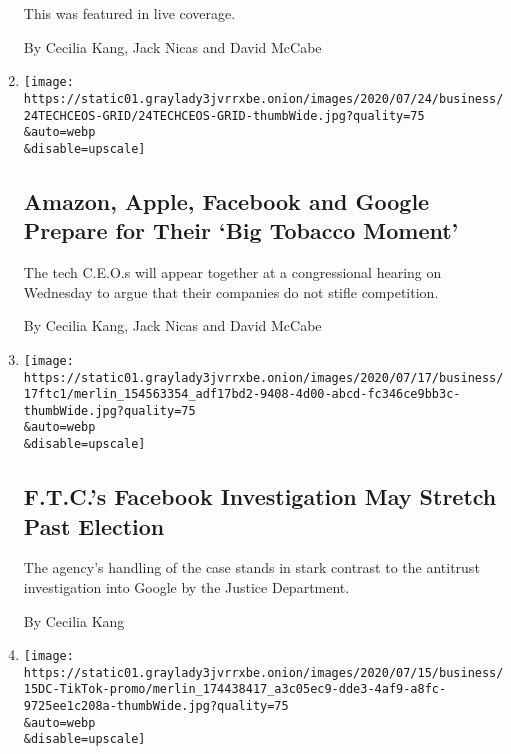 \begin{enumerate}
  This was featured in live coverage.

  By Cecilia Kang, Jack Nicas and David McCabe
\item
  \href{/2020/07/28/technology/amazon-apple-facebook-google-antitrust-hearing.html}{}

  \texttt{[image: https://static01.graylady3jvrrxbe.onion/images/2020/07/24/business/24TECHCEOS-GRID/24TECHCEOS-GRID-thumbWide.jpg?quality=75\\\&auto=webp\\\&disable=upscale]}

  \hypertarget{amazon-apple-facebook-and-google-prepare-for-their-big-tobacco-moment}{%
  \subsection{Amazon, Apple, Facebook and Google Prepare for Their `Big
  Tobacco
  Moment'}\label{amazon-apple-facebook-and-google-prepare-for-their-big-tobacco-moment}}

  The tech C.E.O.s will appear together at a congressional hearing on
  Wednesday to argue that their companies do not stifle competition.

  By Cecilia Kang, Jack Nicas and David McCabe
\item
  \href{/2020/07/17/technology/ftc-facebook-investigation.html}{}

  \texttt{[image: https://static01.graylady3jvrrxbe.onion/images/2020/07/17/business/17ftc1/merlin\_154563354\_adf17bd2-9408-4d00-abcd-fc346ce9bb3c-thumbWide.jpg?quality=75\\\&auto=webp\\\&disable=upscale]}

  \hypertarget{ftcs-facebook-investigation-may-stretch-past-election}{%
  \subsection{F.T.C.'s Facebook Investigation May Stretch Past
  Election}\label{ftcs-facebook-investigation-may-stretch-past-election}}

  The agency's handling of the case stands in stark contrast to the
  antitrust investigation into Google by the Justice Department.

  By Cecilia Kang
\item
  \href{/2020/07/15/technology/tiktok-washington-lobbyist.html}{}

  \texttt{[image: https://static01.graylady3jvrrxbe.onion/images/2020/07/15/business/15DC-TikTok-promo/merlin\_174438417\_a3c05ec9-dde3-4af9-a8fc-9725ee1c208a-thumbWide.jpg?quality=75\\\&auto=webp\\\&disable=upscale]}


\end{enumerate}
